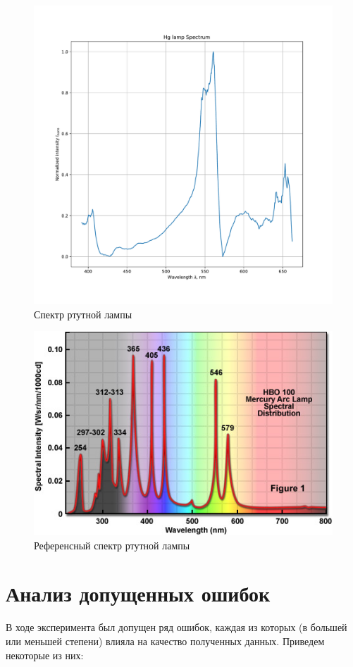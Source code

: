 \documentclass[a4paper, 12pt]{article}
\begin{document}
\begin{figure}[H]
	\centering
	\includegraphics[width=0.7\linewidth]{Hg.pdf}
	\caption{Спектр ртутной лампы}
	\label{fig:Hg}
\end{figure}

\begin{figure}[H]
	\centering
	\includegraphics[width=0.7\linewidth]{hg_ref}
	\caption{Референсный спектр ртутной лампы}
	\label{fig:hg_ref}
\end{figure}

\section{Анализ допущенных ошибок}

В ходе эксперимента был допущен ряд ошибок, каждая из которых (в большей или меньшей степени) влияла на качество полученных данных. Приведем некоторые из них:
\end{document}
